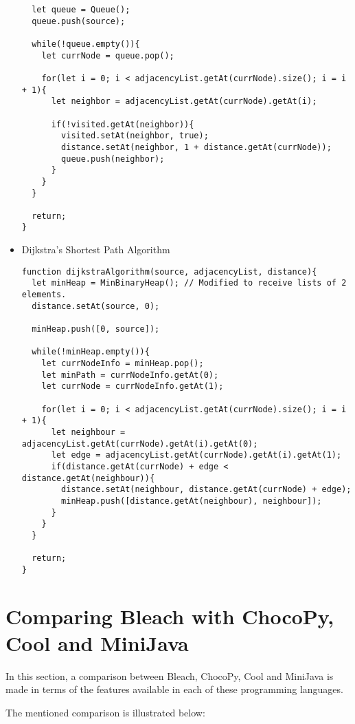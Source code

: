 \begin{itemize}
\begin{lstlisting}
  let queue = Queue();
  queue.push(source);

  while(!queue.empty()){
    let currNode = queue.pop();

    for(let i = 0; i < adjacencyList.getAt(currNode).size(); i = i + 1){
      let neighbor = adjacencyList.getAt(currNode).getAt(i);

      if(!visited.getAt(neighbor)){
        visited.setAt(neighbor, true);
        distance.setAt(neighbor, 1 + distance.getAt(currNode));
        queue.push(neighbor);
      }
    }
  }

  return;
}
        \end{lstlisting}
    \item Dijkstra's Shortest Path Algorithm
        \begin{lstlisting}
function dijkstraAlgorithm(source, adjacencyList, distance){
  let minHeap = MinBinaryHeap(); // Modified to receive lists of 2 elements.
  distance.setAt(source, 0);

  minHeap.push([0, source]);

  while(!minHeap.empty()){
    let currNodeInfo = minHeap.pop();
    let minPath = currNodeInfo.getAt(0);
    let currNode = currNodeInfo.getAt(1);

    for(let i = 0; i < adjacencyList.getAt(currNode).size(); i = i + 1){
      let neighbour = adjacencyList.getAt(currNode).getAt(i).getAt(0);
      let edge = adjacencyList.getAt(currNode).getAt(i).getAt(1);
      if(distance.getAt(currNode) + edge < distance.getAt(neighbour)){
        distance.setAt(neighbour, distance.getAt(currNode) + edge);
        minHeap.push([distance.getAt(neighbour), neighbour]);
      }
    }
  }

  return;
}
        \end{lstlisting}
\end{itemize}

\newpage

\section{Comparing Bleach with ChocoPy, Cool and MiniJava}
In this section, a comparison between Bleach, ChocoPy, Cool and MiniJava is made in terms of the features available in each of these programming languages.

The mentioned comparison is illustrated below:

